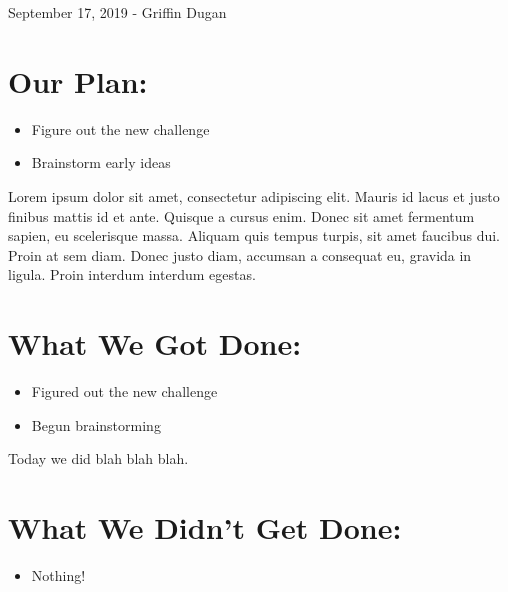 \documentclass[12pt]{article}
\begin{document}
September 17, 2019 - Griffin Dugan

\section{Our Plan:} %
\begin{itemize}
	\item Figure out the new challenge
\item Brainstorm early ideas
\end{itemize}

Lorem ipsum dolor sit amet, consectetur adipiscing elit. Mauris id lacus et justo finibus mattis id et ante. Quisque a cursus enim. Donec sit amet fermentum sapien, eu scelerisque massa. Aliquam quis tempus turpis, sit amet faucibus dui. Proin at sem diam. Donec justo diam, accumsan a consequat eu, gravida in ligula. Proin interdum interdum egestas.

\section{What We Got Done:} %
\begin{itemize}
	\item Figured out the new challenge
	\item Begun brainstorming
\end{itemize}

Today we did blah blah blah.

\section{What We Didn't Get Done:} %
\begin{itemize}
	\item Nothing!
\end{itemize}
\end{document}
